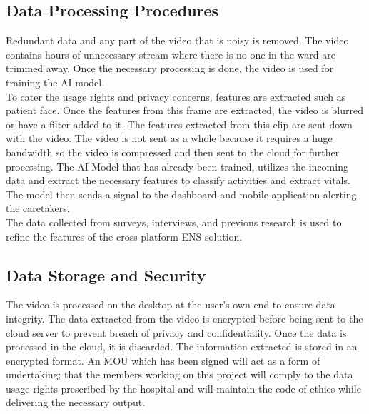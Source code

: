 \subsection{Data Processing Procedures}
Redundant data and any part of the video that is noisy is removed. The video contains hours of unnecessary stream where there is no one in the ward are trimmed away. Once the necessary processing is done, the video is used for training the AI model.\\
To cater the usage rights and privacy concerns, features are extracted such as patient face. Once the features from this frame are extracted, the video is blurred or have a filter added to it.
The features extracted from this clip are sent down with the video. The video is not sent as a whole because it requires a huge bandwidth so the video is compressed and then sent to the cloud for further processing. The AI Model that has already been trained, utilizes the incoming data and extract the necessary features to classify activities and extract vitals. The model then sends a signal to the dashboard and mobile application alerting the caretakers.\\
The data collected from surveys, interviews, and previous research is used to refine the features of the cross-platform ENS solution.

\subsection{Data Storage and Security}
The video is processed on the desktop at the user’s own end to ensure data integrity. The data extracted from the video is encrypted before being sent to the cloud server to prevent breach of privacy and confidentiality. Once the data is processed in the cloud, it is discarded. The information extracted is stored in an encrypted format. An MOU which has been signed will act as a form of undertaking; that the members working on this project will comply to the data usage rights prescribed by the hospital and will maintain the code of ethics while delivering the necessary output.

